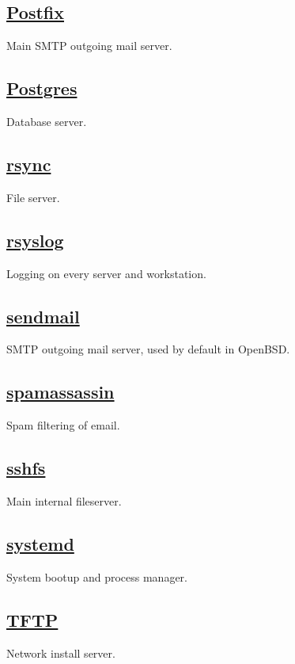 \subsection{\href{http://www.postfix.org/}{Postfix}}
Main SMTP outgoing mail server.

\subsection{\href{http://www.postgresql.org/}{Postgres}}
Database server.

\subsection{\href{http://rsync.samba.org/}{rsync}}
File server.

\subsection{\href{http://www.rsyslog.com/}{rsyslog}}
Logging on every server and workstation.

\subsection{\href{http://www.openbsd.org/cgi-bin/man.cgi/OpenBSD-current/man8/sendmail.8?query=sendmail&sec=8}{sendmail}}
SMTP outgoing mail server, used by default in OpenBSD.

\subsection{\href{http://www.spamassassin.org/}{spamassassin}}
Spam filtering of email.

\subsection{\href{http://fuse.sourceforge.net/sshfs.html}{sshfs}}
Main internal fileserver.

\subsection{\href{http://www.freedesktop.org/wiki/Software/systemd}{systemd}}
System bootup and process manager.

\subsection{\href{http://dnsmasq.org/}{TFTP}}
Network install server.

